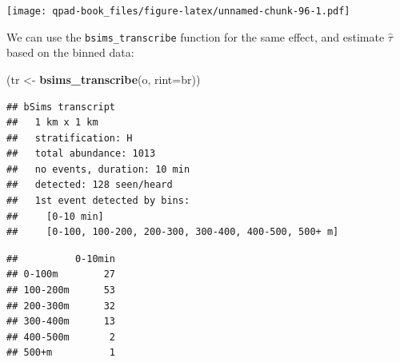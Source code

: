 \documentclass[12pt,]{book}
\newenvironment{Shaded}{\begin{snugshade}}{\end{snugshade}}
\newcommand{\DataTypeTok}[1]{\textcolor[rgb]{0.13,0.29,0.53}{#1}}
\newcommand{\DecValTok}[1]{\textcolor[rgb]{0.00,0.00,0.81}{#1}}
\newcommand{\KeywordTok}[1]{\textcolor[rgb]{0.13,0.29,0.53}{\textbf{#1}}}
\newcommand{\NormalTok}[1]{#1}
\newcommand{\OperatorTok}[1]{\textcolor[rgb]{0.81,0.36,0.00}{\textbf{#1}}}
\newcommand{\StringTok}[1]{\textcolor[rgb]{0.31,0.60,0.02}{#1}}
\begin{document}
\texttt{[image: qpad-book\_files/figure-latex/unnamed-chunk-96-1.pdf]}

We can use the \texttt{bsims\_transcribe} function for the same effect,
and estimate \(\hat{\tau}\) based on the binned data:

\begin{Shaded}
\begin{Highlighting}[]
\NormalTok{(tr <-}\StringTok{ }\KeywordTok{bsims_transcribe}\NormalTok{(o, }\DataTypeTok{rint=}\NormalTok{br))}
\end{Highlighting}
\end{Shaded}

\begin{verbatim}
## bSims transcript
##   1 km x 1 km
##   stratification: H
##   total abundance: 1013
##   no events, duration: 10 min
##   detected: 128 seen/heard
##   1st event detected by bins:
##     [0-10 min]
##     [0-100, 100-200, 200-300, 300-400, 400-500, 500+ m]
\end{verbatim}

\begin{Shaded}
\end{Shaded}

\begin{verbatim}
##          0-10min
## 0-100m        27
## 100-200m      53
## 200-300m      32
## 300-400m      13
## 400-500m       2
## 500+m          1
\end{verbatim}

\begin{Shaded}
\end{Shaded}
\end{document}
